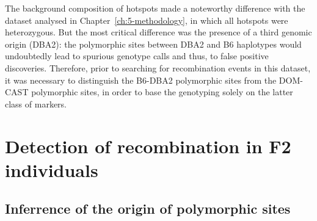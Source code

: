The background composition of hotspots made a noteworthy difference with the dataset analysed in Chapter~\ref{ch:5-methodology}, in which all hotspots were heterozygous.
But the most critical difference was the presence of a third genomic origin (DBA2): the polymorphic sites between DBA2 and B6 haplotypes would undoubtedly lead to spurious genotype calls and thus, to false positive discoveries.
Therefore, prior to searching for recombination events in this dataset, it was necessary to distinguish the B6-DBA2 polymorphic sites from the DOM-CAST polymorphic sites, in order to base the genotyping solely on the latter class of markers.







\section{Detection of recombination in F2 individuals}
\subsection{Inferrence of the origin of polymorphic sites}

%
%


